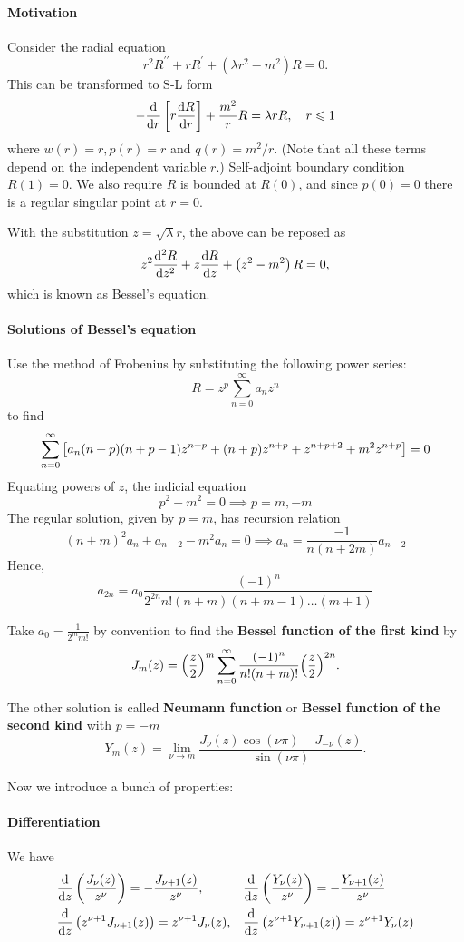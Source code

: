 \documentclass[a4paper]{article}
\begin{document}
\paragraph{Motivation}

Consider the radial equation
\[
r^2 R^{\prime \prime}+r R^{\prime}+\left(\lambda r^2-m^2\right) R=0 .
\]
This can be transformed to S-L form 
\[
-\frac{\mathrm{d}}{\mathrm{d}r} \left[r \dv{R}{r} \right]+\frac{m^2}{r} R=\lambda r R,\quad r \leqslant 1
\]
where $w(r)=r, p(r)=r$ and $q(r)=m^2 / r$. (Note that all these terms depend on the independent variable $r$.) Self-adjoint boundary condition \( R(1) = 0 \).
We also require \( R \) is bounded at \( R(0) \), and since \( p(0) = 0 \) there is a regular singular point at \( r = 0 \).

\begin{definition}
    With the substitution $z=\sqrt{\lambda} r$, the above can be reposed as
    \[
    z^2 \dv[2]{R}{z} +z \dv{R}{z}+\left(z^2-m^2\right) R=0,
    \]
    which is known as Bessel's equation.
\end{definition}

\paragraph{Solutions of Bessel's equation} Use the method of Frobenius by substituting the following power series:
\[
	R = z^p \sum_{n=0}^\infty a_n z^n
\]
to find
\[
	\sum_{n=0}^\infty \qty[ a_n (n+p)(n+p-1) z^{n+p} + (n+p) z^{n+p} + z^{n+p+2} + m^2 z^{n+p} ] = 0
\]
Equating powers of \( z \), the indicial equation
\[
	p^2 - m^2 = 0 \implies p = m, -m
\]
The regular solution, given by \( p = m \), has recursion relation
\[
	(n+m)^2 a_n + a_{n-2} - m^2 a_n = 0 \implies a_n = \frac{-1}{n(n+2m)} a_{n-2}
\]
Hence,
\[
	a_{2n} = a_0 \frac{(-1)^n}{2^{2n} n!
		(n+m)(n+m-1) \dots (m+1)}
\]
\begin{proposition}
    Take $ a_0 = \frac{1}{2^m m!} $ by convention to find the \textbf{Bessel function of the first kind} by
    \[
        J_m(z) = \qty(\frac{z}{2})^m \sum_{n=0}^\infty \frac{(-1)^n}{n!
            (n+m)!} \qty(\frac{z}{2})^{2n}.
    \]

    The other solution is called \textbf{Neumann function} or \textbf{Bessel function of the second kind} with $ p=-m $
    \[
        Y_m(z) = \lim_{\nu \to m} \frac{J_\nu(z)\cos(\nu\pi)-J_{-\nu}(z)}{\sin(\nu\pi)}. 
    \]
\end{proposition}

Now we introduce a bunch of properties: 
\paragraph{Differentiation} We have
\begin{align*}
    &\dv{}{z}\left(\frac{J_\nu(z)}{z^\nu}\right) =-\frac{J_{\nu+1}(z)}{z^\nu},& & \dv{}{z}\left(\frac{Y_\nu(z)}{z^\nu}\right)=-\frac{Y_{\nu+1}(z)}{z^\nu} \\
    &\dv{}{z}\left(z^{\nu+1} J_{\nu+1}(z)\right) =z^{\nu+1} J_\nu(z),& & \dv{}{z}\left(z^{\nu+1} Y_{\nu+1}(z)\right) =z^{\nu+1} Y_\nu(z)
\end{align*}
\end{document}
